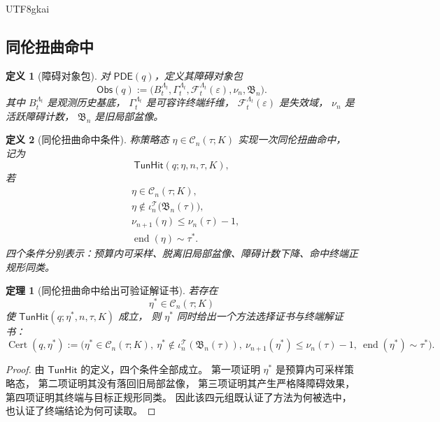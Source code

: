 \documentclass[12pt]{article}
\newtheorem{definition}{定义}[section]
\newtheorem{theorem}{定理}[section]
\newcommand{\PDE}{\mathsf{PDE}}
\newcommand{\Obs}{\mathsf{Obs}}
\newcommand{\TunHit}{\mathsf{TunHit}}
\newcommand{\Cert}{\operatorname{Cert}}
\newcommand{\Endp}{\operatorname{end}}
\begin{document}
\begin{CJK*}{UTF8}{gkai}
\subsection{同伦扭曲命中}
\label{subsec:tex53-tunhit}

\begin{definition}[障碍对象包]
对 \(\PDE(q)\)，定义其障碍对象包
\[
  \Obs(q)
  :=
  \bigl(
    B_t^{\Lambda_t},
    \Gamma_t^{\Lambda_t},
    \mathcal F_t^{\Lambda_t}(\varepsilon),
    \nu_n,
    \mathfrak B_n
  \bigr).
\]
其中 \(B_t^{\Lambda_t}\) 是观测历史基底，
\(\Gamma_t^{\Lambda_t}\) 是可容许终端纤维，
\(\mathcal F_t^{\Lambda_t}(\varepsilon)\) 是失效域，
\(\nu_n\) 是活跃障碍计数，
\(\mathfrak B_n\) 是旧局部盆像。
\end{definition}

\begin{definition}[同伦扭曲命中条件]
称策略态 \(\eta\in\mathcal C_n(\tau;K)\) 实现一次同伦扭曲命中，
记为
\[
  \TunHit(q;\eta,n,\tau,K),
\]
若
\[
\begin{aligned}
  &\eta\in\mathcal C_n(\tau;K),\\
  &\eta\notin\iota_n^{\mathcal T}\bigl(\mathfrak B_n(\tau)\bigr),\\
  &\nu_{n+1}(\eta)\le \nu_n(\tau)-1,\\
  &\Endp(\eta)\sim\tau^\ast.
\end{aligned}
\]
四个条件分别表示：预算内可采样、脱离旧局部盆像、障碍计数下降、命中终端正规形同类。
\end{definition}

\begin{theorem}[同伦扭曲命中给出可验证解证书]
\label{thm:tex53-hit-cert}
若存在
\[
  \eta^\ast\in\mathcal C_n(\tau;K)
\]
使 \(\TunHit(q;\eta^\ast,n,\tau,K)\) 成立，
则 \(\eta^\ast\) 同时给出一个方法选择证书与终端解证书：
\[
  \Cert(q,\eta^\ast)
  :=
  \bigl(
    \eta^\ast\in\mathcal C_n(\tau;K),\
    \eta^\ast\notin\iota_n^{\mathcal T}(\mathfrak B_n(\tau)),\
    \nu_{n+1}(\eta^\ast)\le\nu_n(\tau)-1,\
    \Endp(\eta^\ast)\sim\tau^\ast
  \bigr).
\]
\end{theorem}

\begin{proof}
由 \(\TunHit\) 的定义，四个条件全部成立。
第一项证明 \(\eta^\ast\) 是预算内可采样策略态，
第二项证明其没有落回旧局部盆像，
第三项证明其产生严格降障碍效果，
第四项证明其终端与目标正规形同类。
因此该四元组既认证了方法为何被选中，
也认证了终端结论为何可读取。
\end{proof}


\end{CJK*}
\end{document}
